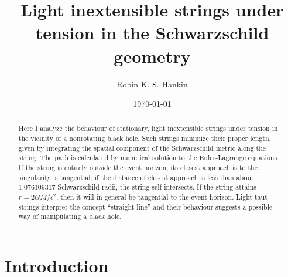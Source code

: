 \documentclass[prb,preprint]{revtex4-1}
\begin{document}

\title{Light inextensible strings under tension in the Schwarzschild geometry}

\author{Robin K. S. Hankin}



\date{\today}

\begin{abstract}
Here I analyze the behaviour of stationary, light inextensible strings
under tension in the vicinity of a nonrotating black hole.  Such
strings minimize their proper length, given by integrating the spatial
component of the Schwarzschild metric along the string.  The path is
calculated by numerical solution to the Euler-Lagrange equations.  If
the string is entirely outside the event horizon, its closest approach
is to the singularity is tangential; if the distance of closest
approach is less than about $1.076109317$ Schwarzschild radii, the
string self-intersects.  If the string attains $r=2GM/c^2$, then it
will in general be tangential to the event horizon.  Light taut
strings interpret the concept ``straight line'' and their behaviour
suggests a possible way of manipulating a black hole.
\end{abstract}

\maketitle %


\section{Introduction} %
\end{document}
